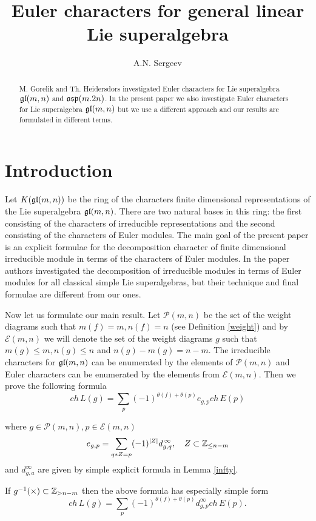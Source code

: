\documentclass[12pt,reqno]{amsart}
\title {Euler characters for  general linear  Lie superalgebra}
\author{A.N. Sergeev}\address{Department of Mathematics, Saratov State University, Astrakhanskaya 83, Saratov 410012   Russian Federation.}
\begin{document}
\maketitle

\begin{abstract}  M. Gorelik and Th. Heidersdors investigated Euler characters for Lie superalgebra  $\frak{gl}(m,n)$ and $\frak{osp}(m.2n)$. In the present paper we also  investigate  Euler characters for Lie superalgebra $\frak{gl}(m,n)$ but we use  a different approach and our  results  are formulated in different terms.
 \end{abstract}
 
\tableofcontents
\section{Introduction}  Let $K(\frak{gl}(m,n))$ be the ring of  the characters finite dimensional representations of the Lie superalgebra $\frak{gl}(m,n)$. There are two   natural bases in this ring:  the first consisting of the characters  of irreducible representations and the second consisting of the characters of  Euler modules.  The main goal of the  present paper  is an explicit formulae for the decomposition character of finite dimensional irreducible module in terms of  the characters of Euler modules. In the paper \cite{GH} authors investigated the decomposition  of irreducible modules in terms of Euler modules for all classical simple Lie superalgebras, but their technique and final formulae are different from our ones. 

Now let us formulate our  main result. Let $\mathcal P(m,n)$ be the set of the weight diagrams such that $m(f)=m, n(f)=n$ (see Definition \ref {weight}) and by $\mathcal E(m,n)$ we will denote the set of the weight diagrams $g$  such that  $m(g)\le m, n(g)\le n$ and $ n(g)-m(g)=n-m$. The irreducible characters  for  $\frak{gl}(m,n)$ can be enumerated by the elements of  $\mathcal P(m,n)$   and Euler    characters can be enumerated by the elements from  $\mathcal E(m,n)$.  Then we prove the following  formula
$$
ch\,L(g)=\sum_{p}(-1)^{\theta(f)+\theta(p)}e_{g,p} ch\,E(p)
$$

where $g\in \mathcal P(m,n), p\in \mathcal E(m,n)$
$$
 e_{g,p}=\sum_{q*Z=p}(-1)^{|Z|}d^{\,\infty}_{g,q},\quad Z\subset \Bbb Z_{\le n-m}
$$ 
and $d^{\infty}_{g,a}$ are given by simple explicit formula in Lemma \ref{infty}.
 
If  $g^{-1}(\times)\subset \Bbb Z_{>n-m}$ then the above formula has especially simple form 
$$
ch\,L(g)=\sum_{p}(-1)^{\theta(f)+\theta(p)}d_{g,p}^{\infty}ch\,E(p).
$$
\end{document}
